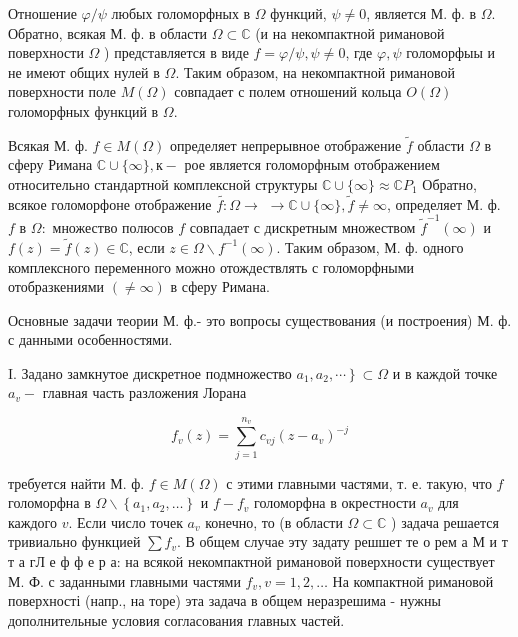 \documentclass[10pt]{article}
\begin{document}
Отношение $\varphi / \psi$ любых голоморфных в $\Omega$ функций, $\psi \neq 0$, является М. ф. в $\Omega$. Обратно, всякая М. ф. в области $\Omega \subset \mathbb{C}$ (и на некомпактной римановой поверхности $\Omega$ ) представляется в виде $f=\varphi / \psi, \psi \neq 0$, где $\varphi, \psi$ голоморфыы и не имеют общих нулей в $\Omega$. Таким образом, на некомпактной римановой поверхности поле $M(\Omega)$ совпадает с полем отношений кольца $O(\Omega)$ голоморфных функций в $\Omega$.



Всякая М. ф. $f \in M(\Omega)$ определяет непрерывное отображение $\tilde{f}$ области $\Omega$ в сферу Римана $\mathbb{C} \cup\{\infty\}, к-$ рое является голоморфным отображением относительно стандартной комплексной структуры $\mathbb{C} \cup\{\infty\} \approx \mathbb{C} P_{1}$ Обратно, всякое голоморфоне отображение $\tilde{f:} \Omega \rightarrow$ $\rightarrow \mathbb{C} \cup\{\infty\}, \tilde{f} \neq \infty$, определяет М. ф. $f$ в $\Omega:$ множество полюсов $f$ совпадает с дискретным множеством $\tilde{f}^{-1}(\infty)$ и $f(z)=\tilde{f}(z) \in \mathbb{C}$, если $z \in \Omega \backslash f^{-1}(\infty)$. Таким образом, М. ф. одного комплексного переменного можно отождествлять с голоморфными отобразкениями $(\neq \infty)$ в сферу Римана.



Основные задачи теории М. ф.- это вопросы существования (и построения) М. ф. с данными особенностями.



I. Задано замкнутое дискретное подмножество $\left.a_{1}, a_{2}, \cdots\right\} \subset \Omega$ и в каждой точке $a_{v}-$ главная часть разложения Лорана



\[

f_{v}(z)=\sum_{j=1}^{n_{v}} c_{v j}\left(z-a_{v}\right)^{-j}

\]



требуется найти М. ф. $f \in M(\Omega)$ с этими главными частями, т. е. такую, что $f$ голоморфна в $\Omega \backslash\left\{a_{1}, a_{2}, \ldots\right\}$ и $f-f_{v}$ голоморфна в окрестности $a_{v}$ для каждого $v$. Если число точек $a_{v}$ конечно, то (в области $\Omega \subset \mathbb{C}$ ) задача решается тривиально функцией $\sum f_{v}$. В общем случае эту задату решшет те о рем а М и т т а гЛ е ф ф е р а: на всякой некомпактной римановой поверхности существует М. Ф. с заданными главными частями $f_{v}, v=1,2, \ldots$ На компактной римановой поверхності (напр., на торе) эта задача в общем неразрешима - нужны дополнительные условия согласования главных частей.
\end{document}
